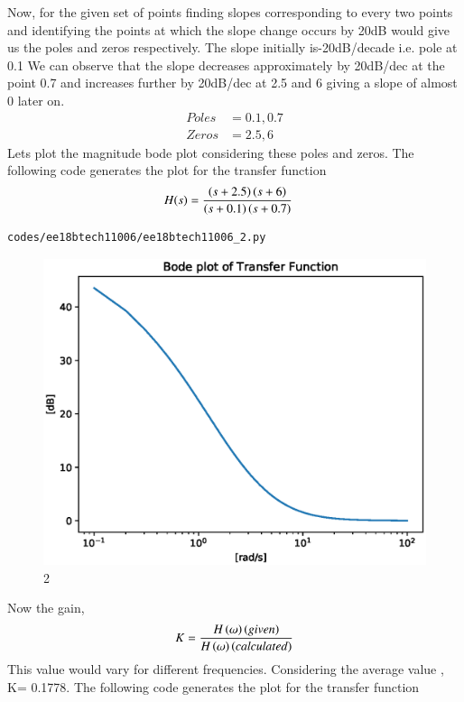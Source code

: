 \begin{enumerate}[label=\thesubsection.\arabic*.,ref=\thesubsection.\theenumi]
Now, for the given set of points finding slopes corresponding to every two points and identifying the points at which the slope change occurs by 20dB would give us the poles and zeros respectively.
The slope initially is-20dB/decade i.e. pole at 0.1 
We can observe that the slope decreases approximately by 20dB/dec at the point 0.7 and increases further by 20dB/dec at 2.5 and 6 giving a slope of almost 0 later on. 
\begin{align}
Poles&= 0.1,0.7\\
Zeros&= 2.5,6
\end{align}
Lets plot the magnitude bode plot considering these poles and zeros.
The following code generates the plot for the transfer function
\begin{align}
H(s) &= \frac{\left(s+2.5\right)\left(s+6\right)}{\left(s+0.1\right)\left(s+0.7\right)}
\end{align}
\begin{lstlisting}
codes/ee18btech11006/ee18btech11006_2.py
\end{lstlisting}
\begin{figure}[!ht]
\centering
\includegraphics[width=\columnwidth]{./figs/ee18btech11006/ee18btech11006_2.eps}
\caption{2}
\label{fig:ee18btech11006_2}
\end{figure}
Now the gain,
\begin{align}
K=\frac{H\left(\omega\right)\left(given\right)}{H\left(\omega\right)\left(calculated\right)} 
\end{align}
This value would vary for different frequencies.
Considering the average value , K= 0.1778. 
The following code generates the plot for the transfer function

\end{enumerate}
